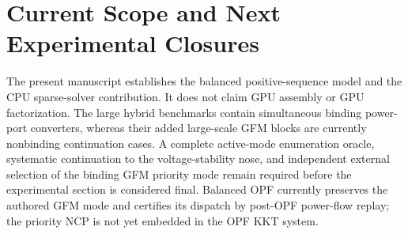 \documentclass[journal,10pt]{IEEEtran}
\begin{document}







\section{Current Scope and Next Experimental Closures}
The present manuscript establishes the balanced positive-sequence model and
the CPU sparse-solver contribution. It does not claim GPU assembly or GPU
factorization. The large hybrid benchmarks contain simultaneous binding
power-port converters, whereas their added large-scale GFM blocks are
currently nonbinding continuation cases. A complete active-mode enumeration
oracle, systematic continuation to the voltage-stability nose, and independent
external selection of the binding GFM priority mode remain required before the
experimental section is considered final. Balanced OPF currently preserves
the authored GFM mode and certifies its dispatch by post-OPF power-flow replay;
the priority NCP is not yet embedded in the OPF KKT system.



\end{document}
